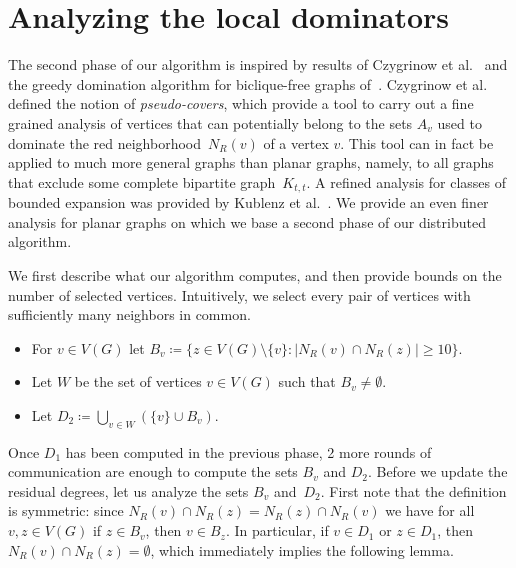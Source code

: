 

\section{Analyzing the local dominators}\label{sec:D2}

The second phase of our algorithm is inspired by results of Czygrinow
et al.~\cite{czygrinow2018distributed} and the greedy domination
algorithm for biclique-free graphs of~\cite{siebertz2019greedy}.
Czygrinow et al.~\cite{czygrinow2018distributed} defined the notion of
\emph{pseudo-covers}, which provide a tool to carry out a fine grained
analysis of vertices that can potentially belong to the sets $A_v$
used to dominate the red neighborhood~$N_R(v)$ of a vertex $v$. This
tool can in fact be applied to much more general graphs than planar
graphs, namely, to all graphs that exclude some complete bipartite
graph~$K_{t,t}$.  A refined analysis for classes of bounded expansion
was provided by Kublenz et al.~\cite{kublenz2020distributed}.  We
provide an even finer analysis for planar graphs on which we base a
second phase of our distributed algorithm.

We first describe what our algorithm computes, and then provide bounds
on the number of selected vertices. Intuitively, we select every pair
of vertices with sufficiently many neighbors in common.

\begin{tcolorbox}[colback=red!5!white,colframe=red!50!black]
\begin{itemize}
\item For $v\in V(G)$ let
  $B_v\coloneqq \{z\in V(G)\setminus \{v\}: |N_R(v)\cap N_R(z)|\geq
  10\}$.\smallskip
\item Let $W$ be the set of vertices $v\in V(G)$ such that
  $B_v \neq \emptyset$.\smallskip
\item Let $D_2\coloneqq \bigcup\limits_{v\in W} (\{v\}\cup B_v)$.
\end{itemize}
\end{tcolorbox}

Once $D_1$ has been computed in the previous phase, 2 more rounds of
communication are enough to compute the sets $B_v$ and $D_2$.
%
Before we update the residual degrees, let us analyze the sets $B_v$
and~$D_2$.  First note that the definition is symmetric: since
$N_R(v)\cap N_R(z)=N_R(z)\cap N_R(v)$ we have for all $v,z\in V(G)$ if
$z\in B_v$, then $v\in B_z$. In particular, if $v\in D_1$ or
$z\in D_1$, then $N_R(v)\cap N_R(z)=\emptyset$, which immediately
implies the following lemma.

